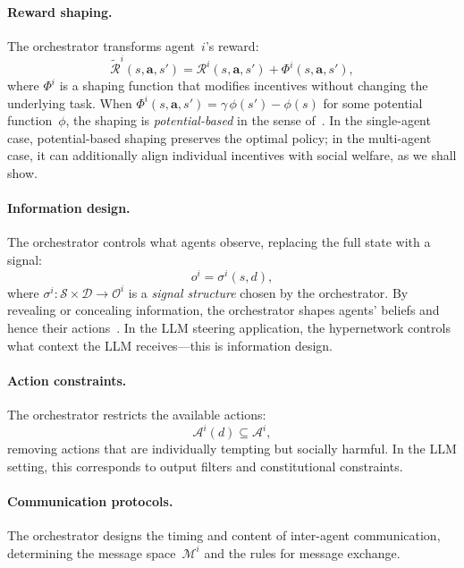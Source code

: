 \paragraph{Reward shaping.} The orchestrator transforms agent~$i$'s reward:
\begin{equation}\label{eq:reward-shaping}
  \tilde{\mathcal{R}}^i(s, \bm{a}, s') = \mathcal{R}^i(s, \bm{a}, s') + \Phi^i(s, \bm{a}, s'),
\end{equation}
where $\Phi^i$ is a shaping function that modifies incentives without changing the underlying task. When $\Phi^i(s,\bm{a},s')=\gamma\,\phi(s') - \phi(s)$ for some potential function~$\phi$, the shaping is \emph{potential-based} in the sense of~\cite{ng1999policy}. In the single-agent case, potential-based shaping preserves the optimal policy; in the multi-agent case, it can additionally align individual incentives with social welfare, as we shall show.

\paragraph{Information design.} The orchestrator controls what agents observe, replacing the full state with a signal:
\begin{equation}\label{eq:information-design}
  o^i = \sigma^i(s, d),
\end{equation}
where $\sigma^i\colon \mathcal{S}\times\mathcal{D} \to \mathcal{O}^i$ is a \emph{signal structure} chosen by the orchestrator. By revealing or concealing information, the orchestrator shapes agents' beliefs and hence their actions~\cite{kamenica2011}. In the LLM steering application, the hypernetwork controls what context the LLM receives---this is information design.

\paragraph{Action constraints.} The orchestrator restricts the available actions:
\begin{equation}\label{eq:action-constraints}
  \mathcal{A}^i(d) \subseteq \mathcal{A}^i,
\end{equation}
removing actions that are individually tempting but socially harmful. In the LLM setting, this corresponds to output filters and constitutional constraints.

\paragraph{Communication protocols.} The orchestrator designs the timing and content of inter-agent communication, determining the message space~$\mathcal{M}^i$ and the rules for message exchange.

